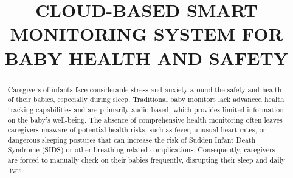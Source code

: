 \documentclass[conference]{IEEEtran}
\begin{document}
\title{CLOUD-BASED SMART MONITORING SYSTEM
FOR BABY HEALTH AND SAFETY
}
\author{
\and
{}
\and 
{}
\and
{}
\and
{}
}

\maketitle

\begin{abstract}
    Caregivers of infants face considerable stress and anxiety around the safety and health
    of their babies, especially during sleep. Traditional baby monitors lack advanced health
   tracking capabilities and are primarily audio-based, which provides limited information
    on the baby’s well-being. The absence of comprehensive health monitoring often leaves
    caregivers unaware of potential health risks, such as fever, unusual heart rates, or dangerous
    sleeping postures that can increase the risk of Sudden Infant Death Syndrome (SIDS) or
    other breathing-related complications. Consequently, caregivers are forced to manually
    check on their babies frequently, disrupting their sleep and daily lives.
\end{abstract}
\end{document}
